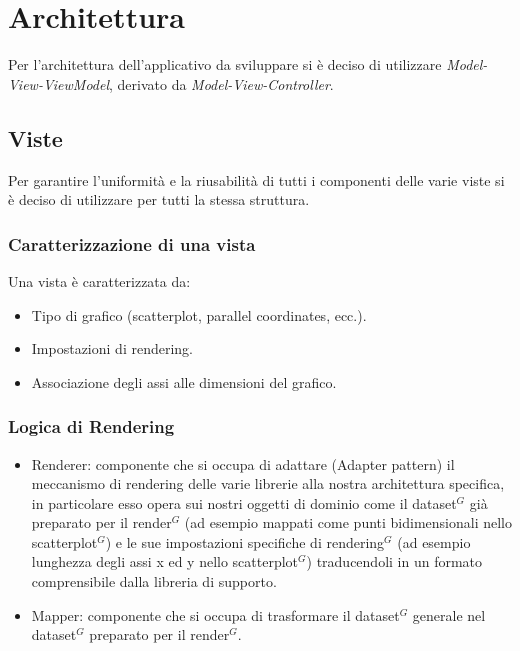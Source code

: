 \section{Architettura}

Per l'architettura dell'applicativo da sviluppare si è deciso di utilizzare
\textit{Model-View-ViewModel}, derivato da \textit{Model-View-Controller}.

\subsection{Viste}
Per garantire l'uniformità e la riusabilità di tutti i componenti delle varie
viste si è deciso di utilizzare per tutti la stessa struttura.

\subsubsection{Caratterizzazione di una vista}
Una vista è caratterizzata da:
\begin{itemize}
  \item Tipo di grafico (scatterplot, parallel coordinates, ecc.).
  \item Impostazioni di rendering.
  \item Associazione degli assi alle dimensioni del grafico.
\end{itemize}

\subsubsection{Logica di Rendering}
\begin{itemize}
  \item Renderer: componente che si occupa di adattare (Adapter pattern) il
    meccanismo di rendering delle varie librerie alla nostra architettura
    specifica, in particolare esso opera sui nostri oggetti di dominio come il
    dataset$^{G}$ già preparato per il render$^{G}$ (ad esempio mappati come punti 
    bidimensionali nello scatterplot$^{G}$) e le sue impostazioni specifiche di
    rendering$^{G}$ (ad esempio lunghezza degli assi x ed y nello scatterplot$^{G}$)
    traducendoli in un formato comprensibile dalla libreria di supporto.
  \item Mapper: componente che si occupa di trasformare il dataset$^{G}$ generale nel
    dataset$^{G}$ preparato per il render$^{G}$.
\end{itemize}

